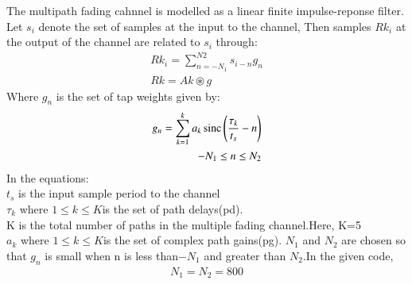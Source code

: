 The multipath fading cahnnel is modelled as a linear finite impulse-reponse filter.
\\
Let $s_i$ denote the set of samples at the input to the channel, Then samples $Rk_i$ at the output of the channel are related to $s_i$ through:
\begin{align}
Rk_i=\sum_{n=-N_1}^{N2}s_{i-n}g_n
\\
Rk=Ak \circledast g
\end{align}
Where $g_n$ is the set of tap weights given by:
\begin{align}
g_n = \sum_{k=1}^{k}a_k \operatorname*{sinc}{\left(\frac{\tau_k}{t_s}-n\right)}
\\
-N_1 \leq n \leq N_2
\end{align}
In the equations:
\\$t_s$ is the input sample period to the channel
\\$\tau_k$ where $1\leq k \leq K$is the set of path delays(pd).
\\K is the total number of paths in the multiple fading channel.Here, K=5 
\\$a_k$ where $1\leq k \leq K$is the set of complex path gains(pg).
$N_1$ and $N_2$ are chosen so that $g_n$ is small when n is less than$-N_1$ and greater than $N_2$.In the given code,
\begin{align}
N_1=N_2=800
\end{align}
